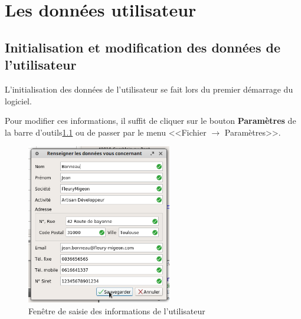 \chapter{Les données utilisateur}
\section{Initialisation et modification des données de l'utilisateur}
L'initialisation des données de l'utilisateur se fait lors du premier démarrage du logiciel.

Pour modifier ces informations, il suffit de cliquer sur le bouton \textbf{Paramètres} de la barre d'outils\ref{fig:modifierUtilisateur} ou de passer par le menu <<Fichier $\rightarrow$ Paramètres>>. 

\begin{figure}[H]
	\centering
	\includegraphics[height=7cm]{screens/modifierUtilisateur.png}
	\caption{Fenêtre de saisie des informations de l'utilisateur}
	\label{fig:modifierUtilisateur}
\end{figure}